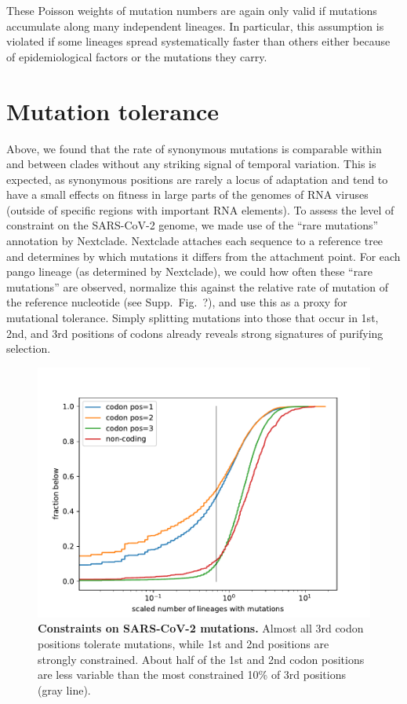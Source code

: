 \documentclass[aps,rmp, twocolumn]{revtex4}
\begin{document}
These Poisson weights of mutation numbers are again only valid if mutations accumulate along many independent lineages.
In particular, this assumption is violated if some lineages spread systematically faster than others either because of epidemiological factors or the mutations they carry.


\section*{Mutation tolerance}

Above, we found that the rate of synonymous mutations is comparable within and between clades without any striking signal of temporal variation.
This is expected, as synonymous positions are rarely a locus of adaptation and tend to have a small effects on fitness in large parts of the genomes of RNA viruses \citep{zanini_vivo_2017} (outside of specific regions with important RNA elements).
To assess the level of constraint on the SARS-CoV-2 genome, we made use of the ``rare mutations'' annotation by Nextclade.
Nextclade attaches each sequence to a reference tree and determines by which mutations it differs from the attachment point.
For each pango lineage (as determined by Nextclade), we could how often these ``rare mutations'' are observed, normalize this against the relative rate of mutation of the reference nucleotide (see Supp.~Fig.~?), and use this as a proxy for mutational tolerance.
Simply splitting mutations into those that occur in 1st, 2nd, and 3rd positions of codons already reveals strong signatures of purifying selection.

 \begin{figure}
    \includegraphics[width=\textwidth]{figures/fitness_cost.pdf}
    \caption{{\bf Constraints on SARS-CoV-2 mutations.}
    Almost all 3rd codon positions tolerate mutations, while 1st and 2nd positions are strongly constrained.
    About half of the 1st and 2nd codon positions are less variable than the most constrained 10\% of 3rd positions (gray line).
    \label{fig:fitness_costs}}
 \end{figure}
\end{document}
